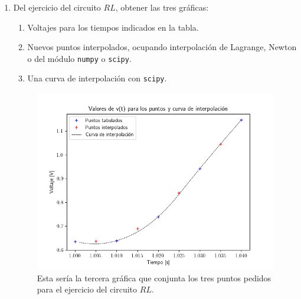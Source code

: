 \begin{enumerate}
\item Del ejercicio del circuito $RL$, obtener las tres gráficas:
\begin{enumerate}[label=\roman*)]
\item Voltajes para los tiempos indicados en la tabla.
\item Nuevos puntos interpolados, ocupando interpolación de Lagrange, Newton o del módulo \texttt{numpy} o \texttt{scipy}.
\item Una curva de interpolación con \texttt{scipy}.
\end{enumerate}
\begin{figure}
    \centering
    \includegraphics[scale=0.55]{Imagenes/diferenciacion_ejercicio_RL_03.png}
    \caption{Esta sería la tercera gráfica que conjunta los tres puntos pedidos para el ejercicio del circuito $RL$.}
\end{figure}

\end{enumerate}


